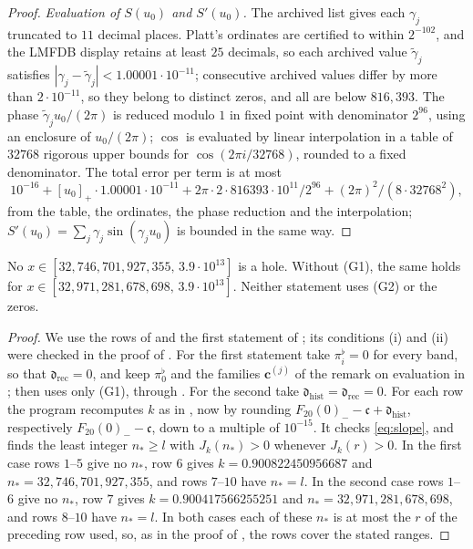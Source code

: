 \documentclass[11pt,colorlinks]{charlie}
\begin{document}
\begin{proof}
\emph{Evaluation of $S(u_0)$ and $S'(u_0)$.} The archived list gives each $\gamma_j$ truncated to $11$ decimal places. Platt's ordinates are certified to within $2^{-102}$, and the LMFDB display retains at least $25$ decimals, so each archived value $\tilde\gamma_j$ satisfies $|\gamma_j-\tilde\gamma_j|<1.00001\cdot10^{-11}$; consecutive archived values differ by more than $2\cdot10^{-11}$, so they belong to distinct zeros, and all are below $816{,}393$. The phase $\tilde\gamma_ju_0/(2\pi)$ is reduced modulo $1$ in fixed point with denominator $2^{96}$, using an enclosure of $u_0/(2\pi)$; $\cos$ is evaluated by linear interpolation in a table of $32768$ rigorous upper bounds for $\cos(2\pi i/32768)$, rounded to a fixed denominator. The total error per term is at most
\[
 10^{-16}+[u_0]_+\cdot1.00001\cdot10^{-11}+2\pi\cdot2\cdot816393\cdot10^{11}/2^{96}+(2\pi)^2/(8\cdot32768^2),
\]
from the table, the ordinates, the phase reduction and the interpolation; $S'(u_0)=\sum_j\gamma_j\sin(\gamma_ju_0)$ is bounded in the same way.
\end{proof}

\begin{proposition}\label{prop:twenty-a}
No $x\in[32{,}746{,}701{,}927{,}355,\,3.9\cdot10^{13}]$ is a hole. Without (G1), the same holds for $x\in[32{,}971{,}281{,}678{,}698,\,3.9\cdot10^{13}]$. Neither statement uses (G2) or the zeros.
\end{proposition}
\begin{proof}
We use the rows of  and the first statement of ; its conditions (i) and (ii) were checked in the proof of . For the first statement take $\pi_i^\flat=0$ for every band, so that $\mathfrak d_{\mathrm{rec}}=0$, and keep $\pi_0^\flat$ and the families $\mathbf c^{(j)}$ of the remark on evaluation in ; then  uses only (G1), through . For the second take $\mathfrak d_{\mathrm{hist}}=\mathfrak d_{\mathrm{rec}}=0$. For each row the program recomputes $k$ as in , now by rounding $F_{20}(0)_--\mathfrak c+\mathfrak d_{\mathrm{hist}}$, respectively $F_{20}(0)_--\mathfrak c$, down to a multiple of $10^{-15}$. It checks \eqref{eq:slope}, and finds the least integer $n_*\ge l$ with $J_k(n_*)>0$ whenever $J_k(r)>0$. In the first case rows $1$--$5$ give no $n_*$, row $6$ gives $k=0.900822450956687$ and $n_*=32{,}746{,}701{,}927{,}355$, and rows $7$--$10$ have $n_*=l$. In the second case rows $1$--$6$ give no $n_*$, row $7$ gives $k=0.900417566255251$ and $n_*=32{,}971{,}281{,}678{,}698$, and rows $8$--$10$ have $n_*=l$. In both cases each of these $n_*$ is at most the $r$ of the preceding row used, so, as in the proof of , the rows cover the stated ranges.
\end{proof}
\end{document}
